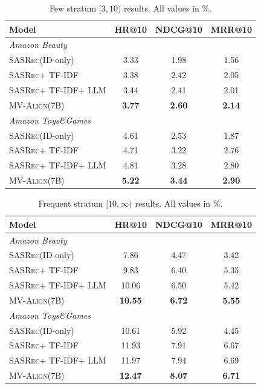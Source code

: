 \documentclass[sigconf,natbib=true]{acmart}
\newcommand{\model}{\textsc{MV-Align}\xspace}
\newcommand{\base}{\textsc{SASRec}\xspace}
\newcommand{\tfidf}{\textsc{TF-IDF}\xspace}
\newcommand{\llm}{\textsc{LLM}\xspace}
\begin{document}
\begin{table}[h]
\caption{Few stratum $[3,10)$ results. All values in \%.}
\label{tab:strata_few}
\centering
\scriptsize
\begin{tabular}{lccc}
\toprule
\textbf{Model} & \textbf{HR@10} & \textbf{NDCG@10} & \textbf{MRR@10} \\
\midrule
\multicolumn{4}{l}{\textit{Amazon Beauty}} \\
\base (ID-only) & 3.33 & 1.98 & 1.56 \\
\base + \tfidf & 3.38 & 2.42 & 2.05 \\
\base + \tfidf + \llm & 3.44 & 2.41 & 2.01 \\
\model (7B) & \textbf{3.77} & \textbf{2.60} & \textbf{2.14} \\
\midrule
\multicolumn{4}{l}{\textit{Amazon Toys\&Games}} \\
\base (ID-only) & 4.61 & 2.53 & 1.87 \\
\base + \tfidf & 4.71 & 3.22 & 2.76 \\
\base + \tfidf + \llm & 4.81 & 3.28 & 2.80 \\
\model (7B) & \textbf{5.22} & \textbf{3.44} & \textbf{2.90} \\
\bottomrule
\end{tabular}
\end{table}

\begin{table}[h]
\caption{Frequent stratum $[10,\infty)$ results. All values in \%.}
\label{tab:strata_frequent}
\centering
\scriptsize
\begin{tabular}{lccc}
\toprule
\textbf{Model} & \textbf{HR@10} & \textbf{NDCG@10} & \textbf{MRR@10} \\
\midrule
\multicolumn{4}{l}{\textit{Amazon Beauty}} \\
\base (ID-only) & 7.86 & 4.47 & 3.42 \\
\base + \tfidf & 9.83 & 6.40 & 5.35 \\
\base + \tfidf + \llm & 10.06 & 6.50 & 5.42 \\
\model (7B) & \textbf{10.55} & \textbf{6.72} & \textbf{5.55} \\
\midrule
\multicolumn{4}{l}{\textit{Amazon Toys\&Games}} \\
\base (ID-only) & 10.61 & 5.92 & 4.45 \\
\base + \tfidf & 11.93 & 7.91 & 6.67 \\
\base + \tfidf + \llm & 11.97 & 7.94 & 6.69 \\
\model (7B) & \textbf{12.47} & \textbf{8.07} & \textbf{6.71} \\
\bottomrule
\end{tabular}
\end{table}
\end{document}
